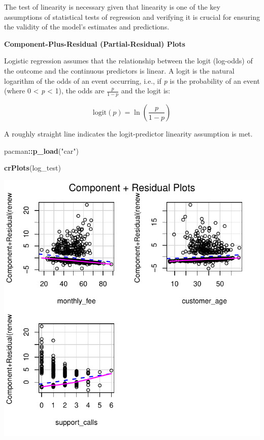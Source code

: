 \documentclass[
]{article}
\newenvironment{Shaded}{\begin{snugshade}}{\end{snugshade}}
\newcommand{\FunctionTok}[1]{\textcolor[rgb]{0.13,0.29,0.53}{\textbf{#1}}}
\newcommand{\NormalTok}[1]{#1}
\newcommand{\SpecialCharTok}[1]{\textcolor[rgb]{0.81,0.36,0.00}{\textbf{#1}}}
\newcommand{\StringTok}[1]{\textcolor[rgb]{0.31,0.60,0.02}{#1}}
\begin{document}
The test of linearity is necessary given that linearity is one of the
key assumptions of statistical tests of regression and verifying it is
crucial for ensuring the validity of the model's estimates and
predictions.

\textbf{Component-Plus-Residual (Partial-Residual) Plots}

Logistic regression assumes that the relationship between the logit
(log-odds) of the outcome and the continuous predictors is linear. A
logit is the natural logarithm of the odds of an event occurring, i.e.,
if \emph{p} is the probability of an event (where 0 \textless{} \emph{p}
\textless{} 1), the odds are \(\frac{p}{1 - p}\) and the logit is:

\[ \text{logit}(p) = \ln\left(\frac{p}{1-p}\right) \]

A roughly straight line indicates the logit-predictor linearity
assumption is met.

\begin{Shaded}
\begin{Highlighting}[]
\NormalTok{pacman}\SpecialCharTok{::}\FunctionTok{p\_load}\NormalTok{(}\StringTok{"car"}\NormalTok{)}

\FunctionTok{crPlots}\NormalTok{(log\_test)}
\end{Highlighting}
\end{Shaded}

\includegraphics{3_logistic_regression_files/figure-latex/test_of_linearity-1.pdf}
\end{document}
